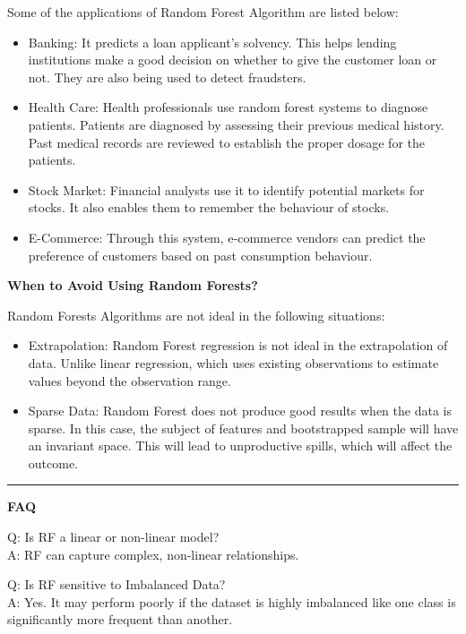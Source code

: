 \documentclass[
  a4paper,
  twoside,
  openright]{book}
\providecommand{\tightlist}{%
  \setlength{\itemsep}{0pt}\setlength{\parskip}{0pt}}
\theoremstyle{definition}
\theoremstyle{definition}
\theoremstyle{definition}
\theoremstyle{definition}
\theoremstyle{remark}
\begin{document}
Some of the applications of Random Forest Algorithm are listed below:

\begin{itemize}
\tightlist
\item
  Banking: It predicts a loan applicant's solvency. This helps lending institutions make a good decision on whether to give the customer loan or not. They are also being used to detect fraudsters.
\item
  Health Care: Health professionals use random forest systems to diagnose patients. Patients are diagnosed by assessing their previous medical history. Past medical records are reviewed to establish the proper dosage for the patients.
\item
  Stock Market: Financial analysts use it to identify potential markets for stocks. It also enables them to remember the behaviour of stocks.
\item
  E-Commerce: Through this system, e-commerce vendors can predict the preference of customers based on past consumption behaviour.
\end{itemize}

\textbf{When to Avoid Using Random Forests?}

Random Forests Algorithms are not ideal in the following situations:

\begin{itemize}
\tightlist
\item
  Extrapolation: Random Forest regression is not ideal in the extrapolation of data. Unlike linear regression, which uses existing observations to estimate values beyond the observation range.
\item
  Sparse Data: Random Forest does not produce good results when the data is sparse. In this case, the subject of features and bootstrapped sample will have an invariant space. This will lead to unproductive spills, which will affect the outcome.
\end{itemize}

\begin{center}\rule{0.5\linewidth}{0.5pt}\end{center}

\textbf{FAQ}

Q: Is RF a linear or non-linear model?\\
A: RF can capture complex, non-linear relationships.

Q: Is RF sensitive to Imbalanced Data?\\
A: Yes. It may perform poorly if the dataset is highly imbalanced like one class is significantly more frequent than another.
\end{document}
